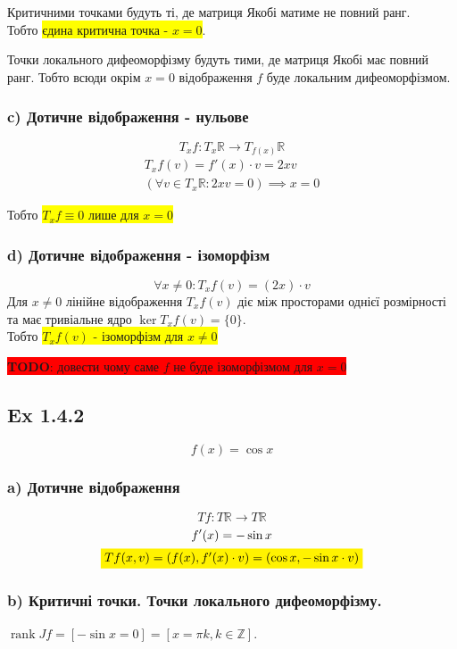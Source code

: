 \documentclass[10pt, a4paper]{article} %
\newcommand{\R}{\mathbb{R}}
\DeclareMathOperator{\rank}{rank}
\newcommand{\todo}[1]{\colorbox{red}{\textbf{TODO}: #1}}
\begin{document}
Критичними точками будуть ті, де матриця Якобі матиме не повний ранг.\\
Тобто \colorbox{yellow}{єдина критична точка - $x=0$}.

Точки локального дифеоморфізму будуть тими, де матриця Якобі має повний ранг.
Тобто всюди окрім $x=0$ відображення $f$ буде локальним дифеоморфізмом.

\subsubsection*{c) Дотичне відображення - нульове}
\[T_{x}f : T_{x}\R \to T_{f(x)}\R\]
\begin{gather*}
    T_{x}f(v) = f'(x) \cdot v = 2xv\\
    \left(\forall v\in T_{x}\R: 2xv = 0\right) \implies  x = 0
\end{gather*}

Тобто \colorbox{yellow}{$T_{x}f \equiv 0$ лише для $x=0$}

\subsubsection*{d) Дотичне відображення - ізоморфізм}

\[\forall x\ne 0: T_{x}f(v) = (2x)\cdot v\]
Для $x\ne 0$ лінійне відображення $T_{x}f(v)$ діє між просторами однієї розмірності та має тривіальне ядро $\ker T_{x}f(v) = \{0\}$. \\
Тобто \colorbox{yellow}{$T_{x}f(v)$ - ізоморфізм для $x\ne 0$}

\todo{довести чому саме $f$ не буде ізоморфізмом для $x = 0$}

\subsection*{Ex 1.4.2}
\begin{mdframed}
    \[f(x) = \cos x\]
\end{mdframed}

\subsubsection*{a) Дотичне відображення}
\[Tf : T\R \to T\R\]
\begin{gather*}
    f'(x) = -\sin x\\
    \colorbox{yellow}{$Tf(x,v) = (f(x), f'(x)\cdot v) = (\cos x, -\sin x \cdot v)$}
\end{gather*}

\subsubsection*{b) Критичні точки. Точки локального дифеоморфізму.}
$\rank Jf = [-\sin x = 0] = [x = \pi k, k\in\mathbb Z]$.
\end{document}
